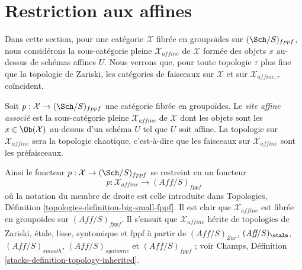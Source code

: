 \section{Restriction aux affines}
\label{section-alternative}

\noindent
Dans cette section, pour une catégorie $\mathcal{X}$ fibrée en groupoïdes sur
$(\Sch/S)_{fppf}$, nous considérons la sous-catégorie pleine $\mathcal{X}_{affine}$
de $\mathcal{X}$ formée des objets $x$ au-dessus de schémas affines $U$.
Nous verrons que, pour toute topologie $\tau$ plus fine que la topologie de Zariski,
les catégories de faisceaux sur $\mathcal{X}$ et sur $\mathcal{X}_{affine, \tau}$
coïncident.

\begin{definition}
\label{definition-alternative}
Soit $p : \mathcal{X} \to (\Sch/S)_{fppf}$ une catégorie fibrée en groupoïdes.
Le {\it site affine associé} est la sous-catégorie pleine
$\mathcal{X}_{affine}$ de $\mathcal{X}$ dont les objets sont les
$x \in \Ob(\mathcal{X})$ au-dessus d'un schéma $U$ tel que $U$
soit affine. La topologie sur $\mathcal{X}_{affine}$ sera la topologie chaotique,
c'est-à-dire que les faisceaux sur $\mathcal{X}_{affine}$ sont les préfaisceaux.
\end{definition}

\noindent
Ainsi le foncteur $p : \mathcal{X} \to (\Sch/S)_{fppf}$ se restreint en un foncteur
$$
p : \mathcal{X}_{affine} \longrightarrow (\textit{Aff}/S)_{fppf}
$$
où la notation du membre de droite est celle introduite dans
Topologies, Définition \ref{topologies-definition-big-small-fppf}.
Il est clair que $\mathcal{X}_{affine}$ est fibrée en groupoïdes sur
$(\textit{Aff}/S)_{fppf}$. Il s'ensuit que $\mathcal{X}_{affine}$
hérite de topologies de Zariski, \'etale, lisse, syntomique et fppf
à partir de $(\textit{Aff}/S)_{Zar}$, $(\textit{Aff}/S)_\etale$,
$(\textit{Aff}/S)_{smooth}$, $(\textit{Aff}/S)_{syntomic}$ et
$(\textit{Aff}/S)_{fppf}$ ; voir
Champs, Définition \ref{stacks-definition-topology-inherited}.

